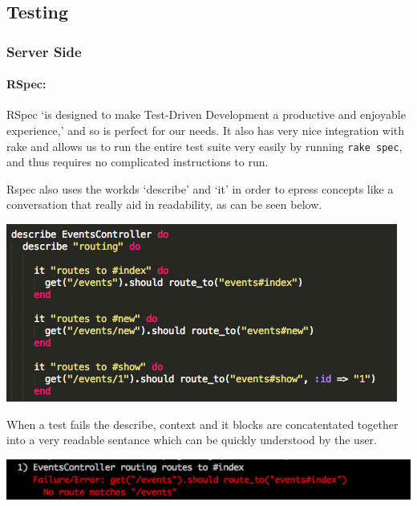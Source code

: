 \subsection{Testing}
  \subsubsection{Server Side}
    \paragraph{RSpec:}
      RSpec `is designed to make Test-Driven Development a productive and enjoyable experience,'\cite{rspec-overview} and so is perfect for our needs. It also has very nice integration with rake and allows us to run the entire test suite very easily by running \verb!rake spec!, and thus requires no complicated instructions to run.

      Rspec also uses the workds `describe' and `it' in order to epress concepts like a conversation that really aid in readability, as can be seen below.

      \includegraphics[scale=0.5]{images/project_management/testing/rspec_events_controller}

      When a test fails the describe, context and it blocks are concatentated together into a very readable sentance which can be quickly understood by the user. 

      \includegraphics[scale=0.5]{images/project_management/testing/rspec_events_contoller_broken}

